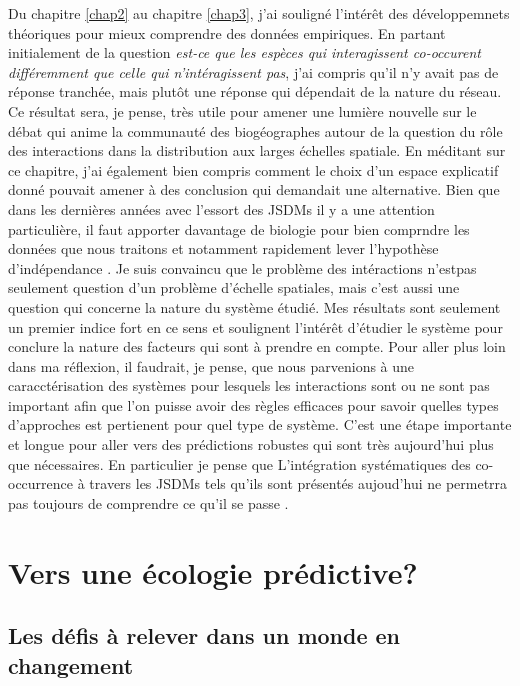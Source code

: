 Du chapitre \ref{chap2} au chapitre \ref{chap3}, j'ai souligné l'intérêt
des développemnets théoriques pour mieux comprendre des données
empiriques. En partant initialement de la question \emph{est-ce que les
espèces qui interagissent co-occurent différemment que celle qui
n'intéragissent pas}, j'ai compris qu'il n'y avait pas de réponse
tranchée, mais plutôt une réponse qui dépendait de la nature du réseau.
Ce résultat sera, je pense, très utile pour amener une lumière nouvelle
sur le débat qui anime la communauté des biogéographes autour de la
question du rôle des interactions dans la distribution aux larges
échelles spatiale. En méditant sur ce chapitre, j'ai également bien
compris comment le choix d'un espace explicatif donné pouvait amener à
des conclusion qui demandait une alternative. Bien que dans les
dernières années avec l'essort des JSDMs il y a une attention
particulière, il faut apporter davantage de biologie pour bien comprndre
les données que nous traitons et notamment rapidement lever l'hypothèse
d'indépendance \citep{Elith2006}. Je suis convaincu que le problème des
intéractions n'estpas seulement question d'un problème d'échelle
spatiales\citep{Araujo2014, Belmaker2015}, mais c'est aussi une question
qui concerne la nature du système étudié. Mes résultats sont seulement
un premier indice fort en ce sens et soulignent l'intérêt d'étudier le
système pour conclure la nature des facteurs qui sont à prendre en
compte. Pour aller plus loin dans ma réflexion, il faudrait, je pense,
que nous parvenions à une caracctérisation des systèmes pour lesquels
les interactions sont ou ne sont pas important afin que l'on puisse
avoir des règles efficaces pour savoir quelles types d'approches est
pertienent pour quel type de système. C'est une étape importante et
longue pour aller vers des prédictions robustes qui sont très
aujourd'hui plus que nécessaires. En particulier je pense que
L'intégration systématiques des co-occurrence à travers les JSDMs tels
qu'ils sont présentés aujoud'hui ne permetrra pas toujours de comprendre
ce qu'il se passe \citep{Ovaskainen2010, Pollock2014, Warton2015b}.

\section*{Vers une écologie
prédictive?}\label{vers-une-uxe9cologie-pruxe9dictive}

\subsection*{Les défis à relever dans un monde en
changement}\label{les-duxe9fis-uxe0-relever-dans-un-monde-en-changement}

